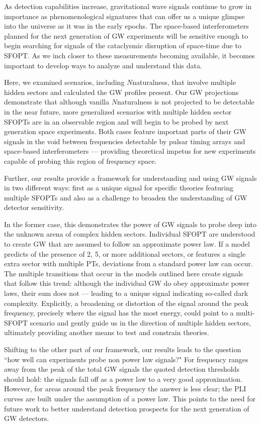 \documentclass[nofootinbib,twocolumn,preprintnumbers]{revtex4-1}
\begin{document}
As detection capabilities increase, gravitational wave signals continue to grow in importance as phenomenological signatures that can offer us a unique glimpse into the universe as it was in the early epochs. The space-based interferometers planned for the next generation of GW experiments will be sensitive enough to begin searching for signals of the cataclysmic disruption of space-time due to SFOPT. As we inch closer to these measurements becoming available, it becomes important to develop ways to analyze and understand this data.

Here, we examined scenarios, including $N$naturalness, that involve multiple hidden sectors and calculated the GW profiles present. Our GW projections demonstrate that although vanilla $N$naturalness is not projected to be detectable in the near future, more generalized scenarios with multiple hidden sector SFOPTs are in an observable region and will begin to be probed by next generation space experiments. Both cases feature important parts of their GW signals in the void between frequencies detectable by pulsar timing arrays and space-based interferometers --- providing theoretical impetus for new experiments capable of probing this region of frequency space. 

Further, our results provide a framework for understanding and using GW signals in two different ways: first as a unique signal for specific theories featuring multiple SFOPTs and also as a challenge to broaden the understanding of GW detector sensitivity. 

In the former case, this demonstrates the power of GW signals to probe deep into the unknown arena of complex hidden sectors. Individual SFOPT are understood to create GW that are assumed to follow an approximate power law. If a model predicts of the presence of 2, 5, or more additional sectors, or features a single extra sector with multiple PTs, deviations from a standard power law can occur. The multiple transitions that occur in the models outlined here create signals that follow this trend: although the individual GW do obey approximate power laws, their sum does not --- leading to a unique signal indicating so-called dark complexity. Explicitly, a broadening or distortion of the signal around the peak frequency, precisely where the signal has the most energy, could point to a multi-SFOPT scenario and gently guide us in the direction of multiple hidden sectors, ultimately providing another means to test and constrain theories.   

Shifting to the other part of our framework, our results leads to the question ``how well can experiments probe non power law signals?" For frequency ranges away from the peak of the total GW signals the quoted detection thresholds should hold: the signals fall off as a power law to a very good approximation. However, for areas around the peak frequency the answer is less clear; the PLI curves are built under the assumption of a power law. This points to the need for future work to better understand detection prospects for the next generation of GW detectors. 
\end{document}
